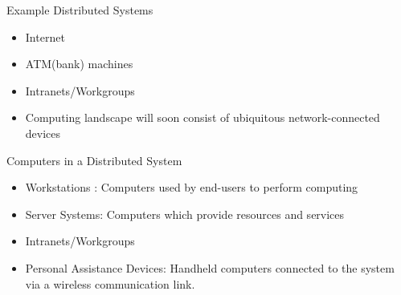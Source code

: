 \documentclass{SKP-beamer}
\begin{document}
\begin{frame}{Example Distributed Systems}
	\begin{itemize}
		\item Internet
		\item ATM(bank) machines
		\item Intranets/Workgroups
		\item Computing landscape will soon consist of 
		ubiquitous network-connected devices
		
		
	\end{itemize}
\end{frame}


\begin{frame}{Computers in a Distributed System}
	\begin{itemize}
		\item Workstations : Computers used by end-users to perform 
		computing
		\item Server Systems: Computers which provide resources and
		services
		\item Intranets/Workgroups
		\item Personal Assistance Devices: Handheld computers connected to the system via a wireless communication link.
		
	\end{itemize}
\end{frame}
\end{document}
